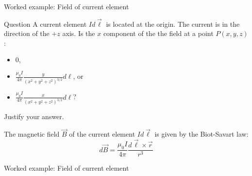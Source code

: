 %
%

{
\problemslide

%
%
%

\begin{frame}{Worked example: Field of current element}

  \begin{blockexmplque}{Question}
    A current element $Id\vec{\ell}$ is located at the origin.
    The current is in the direction of the $+z$ axis.
    Is the $x$ component of the the field at a point $P$$(x,y,z)$:
    \begin{itemize}
      \item 0,
      \item $\displaystyle \frac{\mu_0 I}{4\pi} \frac{y}{(x^2+y^2+z^2)^{3/2}} d\ell$, or
      \item $\displaystyle \frac{\mu_0 I}{4\pi} \frac{x}{(x^2+y^2+z^2)^{3/2}} d\ell$?
    \end{itemize}
    Justify your answer.
  \end{blockexmplque}

  The magnetic field $\vec{B}$ of the current element $Id\vec{\ell}$
  is given by the Biot-Savart law:
  \begin{equation*}
    d\vec{B} = \frac{\mu_0 I}{4\pi} \frac{d\vec{\ell} \times \vec{r}}{r^3}
  \end{equation*}

\end{frame}

%
%
%

\begin{frame}{Worked example: Field of current element}


\end{frame}}

